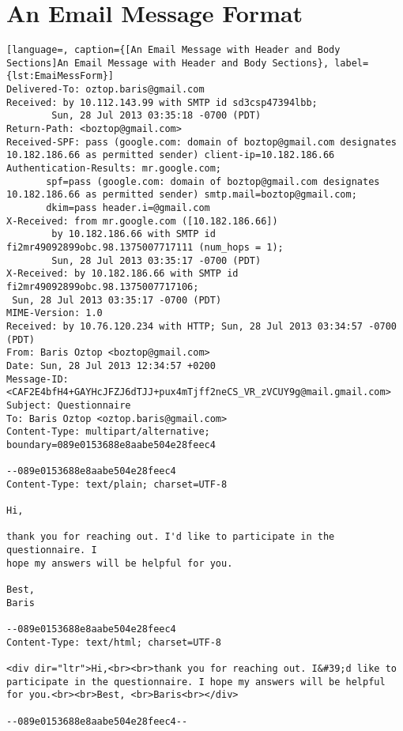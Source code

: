 \clearemptydoublepage
{}
\chapter{An Email Message Format}
\label{app:EmaiMessForm}

\textbf{}


\begin{lstlisting}[language=, caption={[An Email Message with Header and Body Sections]An Email Message with Header and Body Sections}, label={lst:EmaiMessForm}]
Delivered-To: oztop.baris@gmail.com
Received: by 10.112.143.99 with SMTP id sd3csp47394lbb;
        Sun, 28 Jul 2013 03:35:18 -0700 (PDT)
Return-Path: <boztop@gmail.com>
Received-SPF: pass (google.com: domain of boztop@gmail.com designates 10.182.186.66 as permitted sender) client-ip=10.182.186.66
Authentication-Results: mr.google.com;
       spf=pass (google.com: domain of boztop@gmail.com designates 10.182.186.66 as permitted sender) smtp.mail=boztop@gmail.com;
       dkim=pass header.i=@gmail.com
X-Received: from mr.google.com ([10.182.186.66])
        by 10.182.186.66 with SMTP id fi2mr49092899obc.98.1375007717111 (num_hops = 1);
        Sun, 28 Jul 2013 03:35:17 -0700 (PDT)
X-Received: by 10.182.186.66 with SMTP id fi2mr49092899obc.98.1375007717106;
 Sun, 28 Jul 2013 03:35:17 -0700 (PDT)
MIME-Version: 1.0
Received: by 10.76.120.234 with HTTP; Sun, 28 Jul 2013 03:34:57 -0700 (PDT)
From: Baris Oztop <boztop@gmail.com>
Date: Sun, 28 Jul 2013 12:34:57 +0200
Message-ID: <CAF2E4bfH4+GAYHcJFZJ6dTJJ+pux4mTjff2neCS_VR_zVCUY9g@mail.gmail.com>
Subject: Questionnaire
To: Baris Oztop <oztop.baris@gmail.com>
Content-Type: multipart/alternative; boundary=089e0153688e8aabe504e28feec4

--089e0153688e8aabe504e28feec4
Content-Type: text/plain; charset=UTF-8

Hi,

thank you for reaching out. I'd like to participate in the questionnaire. I
hope my answers will be helpful for you.

Best,
Baris

--089e0153688e8aabe504e28feec4
Content-Type: text/html; charset=UTF-8

<div dir="ltr">Hi,<br><br>thank you for reaching out. I&#39;d like to participate in the questionnaire. I hope my answers will be helpful for you.<br><br>Best, <br>Baris<br></div>

--089e0153688e8aabe504e28feec4--
\end{lstlisting}